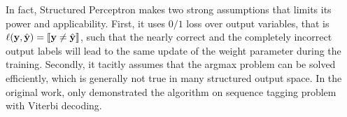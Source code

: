 {\iffalse
The update usually leads to over-fitting and a simple refinement, called "average parameter" similar to \citep{Freund99large}, is shown in (Algorithm~\ref{algorithm_structured_perceptron}).
\begin{algorithm}
\caption{Structured Perceptron with Parameter Averaging}
\label{algorithm_structured_perceptron}
\begin{algorithmic}[1]
	\REQUIRE Training sample $\lbrace (\vx_i,\vy_i)\rbrace_{i=1}^m$
	\ENSURE Weight parameter $\vw$
	\STATE $\vw^{t,i}=[0,\cdots,0],\,\forall t\in\{1,\cdots,T\},\,\forall i\in\{1,\cdots,m\}$
	\FOR{$t=1\cdots T$}
		\FOR{$i=1\cdots m$}
			\STATE $\hat{\vy} = \underset{\vy\in\vYcal}{\argmax} \quad \ip{\vw^{t-1,i-1}}{\phib(\vx_i,\vy)}$
			\IF{$\hat{\vy}\neq\vy$}
				\STATE $\vw^{t,i} = \vw^{t-1,i-1} + \phib(\vx_i,\vy_i) - \phib(\vx_i,\hat{\vy}_i)$
			\ENDIF
		\ENDFOR
	\ENDFOR
	\RETURN $\vw = \frac{1}{Tm}\sum_{t=1}^{T}\sum_{i=1}^{m}\vw^{t,i}$
\end{algorithmic}
\end{algorithm}
\fi

In fact, Structured Perceptron makes two strong assumptions that limits its power and applicability.
First, it uses $0/1$ loss over output variables, that is $\mathbf {\ell}(\mathbf {y},\hat{\mathbf {y}})={\llbracket \mathbf {y}\neq\hat{\mathbf {y}} \rrbracket}$, such that the nearly correct and the completely incorrect output labels will lead to the same update of the weight parameter during the training.
Secondly, it tacitly assumes that the argmax problem can be solved efficiently, which is generally not true in many structured output space.
In the original work, \citet{collins02a} only demonstrated the algorithm on sequence tagging problem with Viterbi decoding.



%
% 
}
